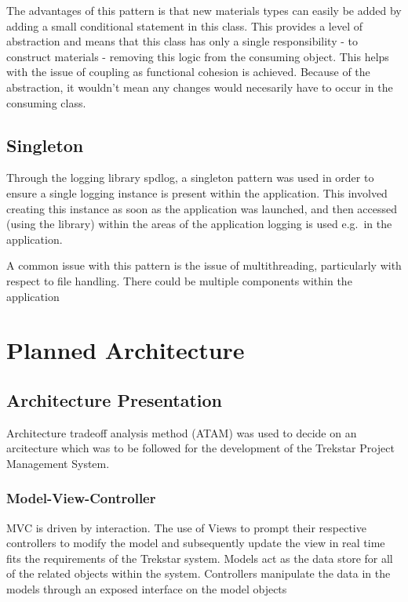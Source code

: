 \documentclass[
  english,
  a4paper,
,tablecaptionabove
]{scrartcl}
\begin{document}
The advantages of this pattern is that new materials types can easily be
added by adding a small conditional statement in this class. This
provides a level of abstraction and means that this class has only a
single responsibility - to construct materials - removing this logic
from the consuming object. This helps with the issue of coupling as
functional cohesion is achieved. Because of the abstraction, it wouldn't
mean any changes would necesarily have to occur in the consuming class.

\hypertarget{singleton}{%
\subsection{Singleton}\label{singleton}}

Through the logging library spdlog, a singleton pattern was used in
order to ensure a single logging instance is present within the
application. This involved creating this instance as soon as the
application was launched, and then accessed (using the library) within
the areas of the application logging is used e.g.~in the application.

A common issue with this pattern is the issue of multithreading,
particularly with respect to file handling. There could be multiple
components within the application

\newpage

\hypertarget{planned-architecture}{%
\section{Planned Architecture}\label{planned-architecture}}

\hypertarget{architecture-presentation}{%
\subsection{Architecture Presentation}\label{architecture-presentation}}

Architecture tradeoff analysis method (ATAM) was used to decide on an
arcitecture which was to be followed for the development of the Trekstar
Project Management System.

\hypertarget{model-view-controller}{%
\subsubsection{Model-View-Controller}\label{model-view-controller}}

MVC is driven by interaction. The use of Views to prompt their
respective controllers to modify the model and subsequently update the
view in real time fits the requirements of the Trekstar system. Models
act as the data store for all of the related objects within the system.
Controllers manipulate the data in the models through an exposed
interface on the model objects
\end{document}
